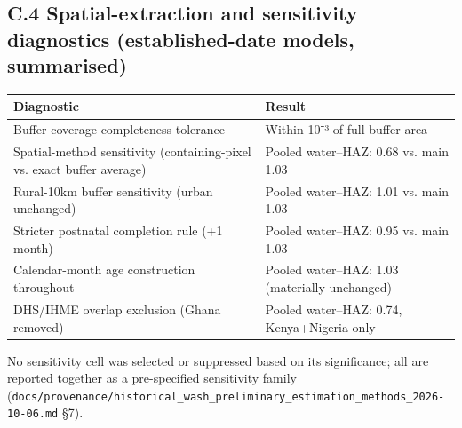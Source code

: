 \subsection*{C.4 Spatial-extraction and sensitivity diagnostics (established-date models, summarised)}

\begingroup\fontsize{10}{15}\selectfont
\begin{longtable}{ll}
\toprule
Diagnostic & Result \\
\midrule
\endhead
Buffer coverage-completeness tolerance & Within 10⁻³ of full buffer area \\
Spatial-method sensitivity (containing-pixel vs. exact buffer average) & Pooled water--HAZ: 0.68 vs. main 1.03 \\
Rural-10km buffer sensitivity (urban unchanged) & Pooled water--HAZ: 1.01 vs. main 1.03 \\
Stricter postnatal completion rule (+1 month) & Pooled water--HAZ: 0.95 vs. main 1.03 \\
Calendar-month age construction throughout & Pooled water--HAZ: 1.03 (materially unchanged) \\
DHS/IHME overlap exclusion (Ghana removed) & Pooled water--HAZ: 0.74, Kenya+Nigeria only \\
\bottomrule
\end{longtable}
\endgroup

No sensitivity cell was selected or suppressed based on its significance; all are reported together as a pre-specified sensitivity family (\texttt{docs/provenance/historical\_wash\_preliminary\_estimation\_methods\_2026-10-06.md} §7).

